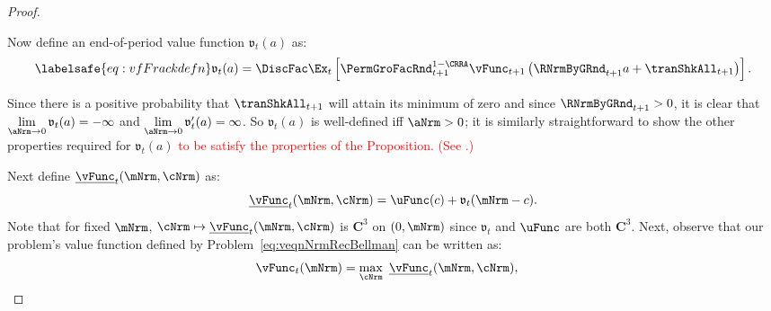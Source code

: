 \documentclass[\econtexRoot/BufferStockTheory]{subfiles}
\begin{document}
\begin{proof}

\hypertarget{BoroCnstNat}{}
Now define an end-of-period value function $\mathfrak{v}_{t}(a) $ as:
\begin{equation}\labelsafe{eq:vfFrackdefn}
  \mathfrak{v}_{t}(a) =\DiscFac \Ex_{t}\left[{\PermGroFacRnd}_{t+1}^{1-\CRRA}\vFunc_{t+1}\left({\RNrmByGRnd}_{t+1} a+{\tranShkAll}_{t+1}\right) \right].%
\end{equation}

Since there is a positive probability that $\tranShkAll_{t+1}$ will
attain its minimum of zero and since ${\RNrmByGRnd}_{t+1}>0$, it
is clear that $\lim\limits_{\aNrm \rightarrow 0} \mathfrak{v}_{t}(a) = -\infty$
and $\lim\limits_{\aNrm \rightarrow 0} \mathfrak{v}^{\prime}_{t}(a) = \infty$.
So
$\mathfrak{v}_{t}(a) $ is well-defined iff $\aNrm>0$; it is similarly
straightforward to show the other properties required for $\mathfrak{v}_{t}(a) $ \textcolor{red}{to
be satisfy the properties of the Proposition.
(See \cite{hiraguchiBSProofs}.)}

Next define $\underline{\vFunc}_{t}(\mNrm,\cNrm)$ as:
%
%
\begin{equation}
  \underline{\vFunc}_{t}(\mNrm,\cNrm)=\uFunc(c)+\mathfrak{v}_{t}(\mNrm-c). 
\end{equation}
%
Note that for fixed $\mNrm$, $\cNrm \mapsto \underline{\vFunc}_{t}(\mNrm,\cNrm)$ is $\mathbf{C}^{3}$ on $(0, \mNrm)$ since $\mathfrak{v}_{t}$ and $\uFunc$ are both
$\mathbf{C}^{3}$.
Next,  observe that our problem's value function defined
by Problem~\eqref{eq:veqnNrmRecBellman} can be written as:
%
%
%
\begin{equation}\begin{gathered}\begin{aligned}
      \vFunc_{t}(\mNrm)  & =  \max_{\cNrm}~\underline{\vFunc}_{t}(\mNrm,\cNrm), 
    \end{aligned}\end{gathered}\end{equation}


\end{proof}
\end{document}
